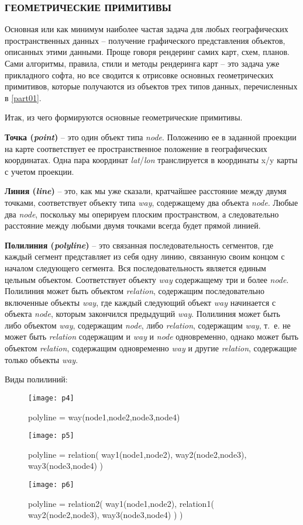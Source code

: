 \subsubsection{ГЕОМЕТРИЧЕСКИЕ ПРИМИТИВЫ}
Основная или как минимум наиболее частая задача для любых географических 
пространственных данных -- получение графического представления объектов, 
описанных этими данными. Проще говоря рендеринг самих карт, схем, планов. Сами 
алгоритмы, правила, стили и методы рендеринга карт -- это задача уже 
прикладного софта, но все сводится к отрисовке основных геометрических 
примитивов, которые получаются из объектов трех типов данных, перечисленных в 
\ref{part01}.

Итак, из чего формируются основные геометрические примитивы.

\textbf{Точка (\emph{point})} -- это один объект типа \emph{node}. Положению 
ее в заданной проекции на карте соответствует ее пространственное положение в 
географических координатах. Одна пара координат \emph{lat}/\emph{lon} 
транслируется в координаты x/y карты с учетом проекции.

\textbf{Линия (\emph{line})} -- это, как мы уже сказали, кратчайшее расстояние 
между двумя точками, соответствует объекту типа \emph{way}, содержащему два 
объекта \emph{node}. Любые два \emph{node}, поскольку мы оперируем плоским 
пространством, а следовательно расстояние между любыми двумя точками всегда 
будет прямой линией.

\textbf{Полилиния (\emph{polyline})} -- это связанная последовательность 
сегментов, где каждый сегмент представляет из себя одну линию, связанную своим 
концом с началом следующего сегмента. Вся последовательность является единым 
цельным объектом. Соответствует объекту \emph{way} содержащему три и более 
\emph{node}. Полилиния может быть объектом \emph{relation}, содержащим 
последовательно включенные объекты \emph{way}, где каждый следующий объект 
\emph{way} начинается с объекта \emph{node}, которым закончился предыдущий 
\emph{way}. Полилиния может быть либо объектом \emph{way}, содержащим 
\emph{node}, либо \emph{relation}, содержащим \emph{way}, т.~е. не может быть 
\emph{relation} содержащим и \emph{way} и \emph{node} одновременно, однако 
может быть объектом \emph{relation}, содержащим одновременно \emph{way} и 
другие \emph{relation}, содержащие только объекты \emph{way}.

Виды полилиний:

\begin{figure}[ht!]
    \center
    \texttt{[image: p4]}
    \caption{polyline = way(node1,node2,node3,node4)}
    \texttt{[image: p5]}
    \caption{polyline = relation( way1(node1,node2), 
        way2(node2,node3), way3(node3,node4) )}
    \texttt{[image: p6]}
    \caption{polyline = relation2( way1(node1,node2), 
        relation1( way2(node2,node3), way3(node3,node4) ) )}
\end{figure}

